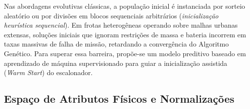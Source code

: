 Nas abordagens evolutivas clássicas, a população inicial é instanciada por sorteio aleatório ou por divisões em blocos sequenciais arbitrários (\textit{inicialização heurística sequencial}). Em frotas heterogêneas operando sobre malhas urbanas extensas, soluções iniciais que ignoram restrições de massa e bateria incorrem em taxas massivas de falha de missão, retardando a convergência do Algoritmo Genético. Para superar essa barreira, propõe-se um modelo preditivo baseado em aprendizado de máquina supervisionado para guiar a inicialização assistida (\textit{Warm Start}) do escalonador.

\subsection{Espaço de Atributos Físicos e Normalizações}

